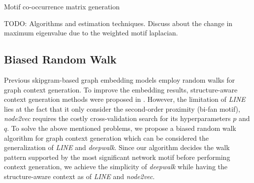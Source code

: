 \documentclass{article}
\theoremstyle{definition}
\begin{document}
\begin{algorithm}[h] \label{al:madj}
\caption{Motif co-occurrence matrix generation}
\end{algorithm}

TODO: Algorithms and estimation techniques. Discuss about
the change in maximum eigenvalue due to the weighted
motif laplacian.

\subsection{Biased Random Walk}

Previous skipgram-based graph embedding models employ random
walks for graph context generation. To improve the embedding results,
structure-aware context generation methods were proposed in \cite{line,node2vec}.
However, the limitation of \emph{LINE} lies at the fact that it only
consider the second-order proximity (bi-fan motif),  \emph{node2vec} requires
the costly cross-validation search for its hyperparameters $p$ and $q$.
To solve the above mentioned problems, we propose a biased random walk
algorithm for graph context generation which can be considered the 
generalization of \emph{LINE} and \emph{deepwalk}. Since our algorithm
decides the walk pattern supported by the most significant network motif before 
performing context generation, we achieve the simplicity of \emph{deepwalk}
while having the structure-aware context as of \emph{LINE} and \emph{node2vec}.
\end{document}

